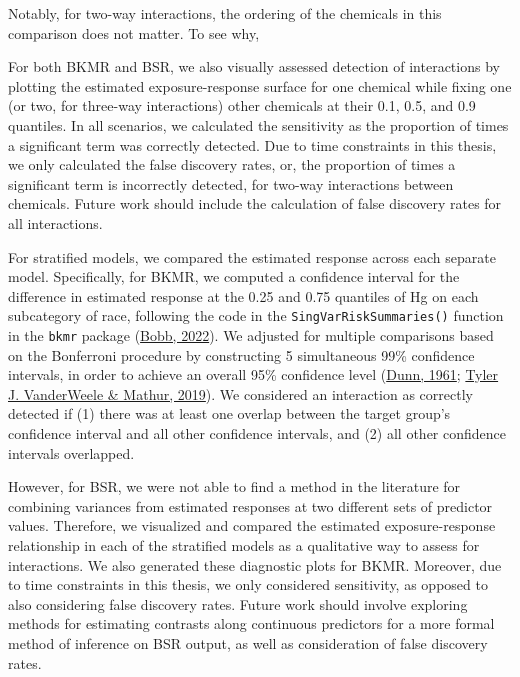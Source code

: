 \documentclass[12pt, twoside]{amherstthesis}
\begin{document}
Notably, for two-way interactions, the ordering of the chemicals in this comparison does not matter. To see why,

For both BKMR and BSR, we also visually assessed detection of interactions by plotting the estimated exposure-response surface for one chemical while fixing one (or two, for three-way interactions) other chemicals at their 0.1, 0.5, and 0.9 quantiles. In all scenarios, we calculated the sensitivity as the proportion of times a significant term was correctly detected. Due to time constraints in this thesis, we only calculated the false discovery rates, or, the proportion of times a significant term is incorrectly detected, for two-way interactions between chemicals. Future work should include the calculation of false discovery rates for all interactions.

For stratified models, we compared the estimated response across each separate model. Specifically, for BKMR, we computed a confidence interval for the difference in estimated response at the 0.25 and 0.75 quantiles of Hg on each subcategory of race, following the code in the \texttt{SingVarRiskSummaries()} function in the \texttt{bkmr} package (\protect\hyperlink{ref-bobb_bkmr_2022}{Bobb, 2022}). We adjusted for multiple comparisons based on the Bonferroni procedure by constructing 5 simultaneous 99\% confidence intervals, in order to achieve an overall 95\% confidence level (\protect\hyperlink{ref-dunn_multiple_1961}{Dunn, 1961}; \protect\hyperlink{ref-vanderweele_desirable_2019}{Tyler J. VanderWeele \& Mathur, 2019}). We considered an interaction as correctly detected if (1) there was at least one overlap between the target group's confidence interval and all other confidence intervals, and (2) all other confidence intervals overlapped.

However, for BSR, we were not able to find a method in the literature for combining variances from estimated responses at two different sets of predictor values. Therefore, we visualized and compared the estimated exposure-response relationship in each of the stratified models as a qualitative way to assess for interactions. We also generated these diagnostic plots for BKMR. Moreover, due to time constraints in this thesis, we only considered sensitivity, as opposed to also considering false discovery rates. Future work should involve exploring methods for estimating contrasts along continuous predictors for a more formal method of inference on BSR output, as well as consideration of false discovery rates.
\end{document}
